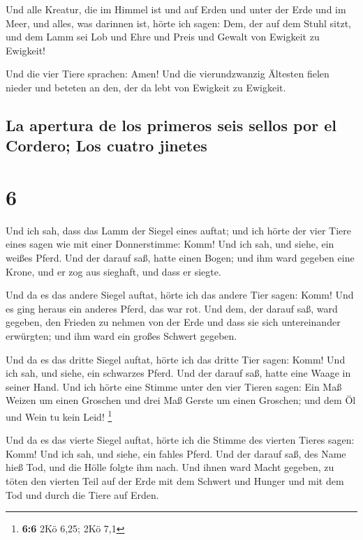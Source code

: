  Und alle Kreatur, die im Himmel ist und auf Erden und
unter der Erde und im Meer, und alles, was darinnen ist, hörte ich
sagen: Dem, der auf dem Stuhl sitzt, und dem Lamm sei Lob und Ehre und
Preis und Gewalt von Ewigkeit zu Ewigkeit!

 Und die vier Tiere sprachen: Amen! Und die
vierundzwanzig Ältesten fielen nieder und beteten an den, der da lebt
von Ewigkeit zu Ewigkeit.

\hypertarget{la-apertura-de-los-primeros-seis-sellos-por-el-cordero-los-cuatro-jinetes}{%
\subsection{La apertura de los primeros seis sellos por el Cordero; Los
cuatro
jinetes}\label{la-apertura-de-los-primeros-seis-sellos-por-el-cordero-los-cuatro-jinetes}}

\hypertarget{section-5}{%
\section{6}\label{section-5}}

 Und ich sah, dass das Lamm der Siegel eines auftat; und
ich hörte der vier Tiere eines sagen wie mit einer Donnerstimme: Komm!
 Und ich sah, und siehe, ein weißes Pferd. Und der darauf
saß, hatte einen Bogen; und ihm ward gegeben eine Krone, und er zog aus
sieghaft, und dass er siegte.

 Und da es das andere Siegel auftat, hörte ich das andere
Tier sagen: Komm!  Und es ging heraus ein anderes Pferd,
das war rot. Und dem, der darauf saß, ward gegeben, den Frieden zu
nehmen von der Erde und dass sie sich untereinander erwürgten; und ihm
ward ein großes Schwert gegeben.

 Und da es das dritte Siegel auftat, hörte ich das dritte
Tier sagen: Komm! Und ich sah, und siehe, ein schwarzes Pferd. Und der
darauf saß, hatte eine Waage in seiner Hand.  Und ich
hörte eine Stimme unter den vier Tieren sagen: Ein Maß Weizen um einen
Groschen und drei Maß Gerste um einen Groschen; und dem Öl und Wein tu
kein Leid! \footnote{\textbf{6:6} 2Kö 6,25; 2Kö 7,1}

 Und da es das vierte Siegel auftat, hörte ich die Stimme
des vierten Tieres sagen: Komm!  Und ich sah, und siehe,
ein fahles Pferd. Und der darauf saß, des Name hieß Tod, und die Hölle
folgte ihm nach. Und ihnen ward Macht gegeben, zu töten den vierten Teil
auf der Erde mit dem Schwert und Hunger und mit dem Tod und durch die
Tiere auf Erden.

